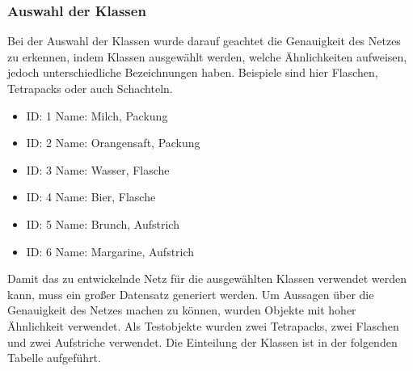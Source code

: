 \documentclass[a4paper,12pt,oneside]{article}
\begin{document}
  \subsubsection{Auswahl der Klassen} 
Bei der Auswahl der Klassen wurde darauf geachtet die Genauigkeit des Netzes zu erkennen, indem Klassen ausgewählt werden, welche Ähnlichkeiten aufweisen, jedoch unterschiedliche Bezeichnungen haben. Beispiele sind hier Flaschen, Tetrapacks oder auch Schachteln.

\vspace{0.5 cm}

\begin{itemize}
\label{tab:klassen1}

\item ID: 1 Name: \glqq Milch, Packung\grqq

\item ID: 2 Name: \glqq Orangensaft, Packung\grqq

\item ID: 3 Name: \glqq Wasser, Flasche\grqq

\item ID: 4 Name: \glqq Bier, Flasche\grqq

\item ID: 5 Name: \glqq Brunch, Aufstrich\grqq

\item ID: 6 Name: \glqq Margarine, Aufstrich\grqq

\end{itemize}
  

Damit das zu entwickelnde Netz für die ausgewählten Klassen verwendet werden kann, muss ein großer Datensatz generiert werden. Um Aussagen über die Genauigkeit des Netzes machen zu können, wurden Objekte mit hoher Ähnlichkeit verwendet. Als Testobjekte wurden zwei Tetrapacks, zwei Flaschen und zwei Aufstriche verwendet. Die Einteilung der Klassen ist in der folgenden Tabelle aufgeführt.
\\
\\
\end{document}
